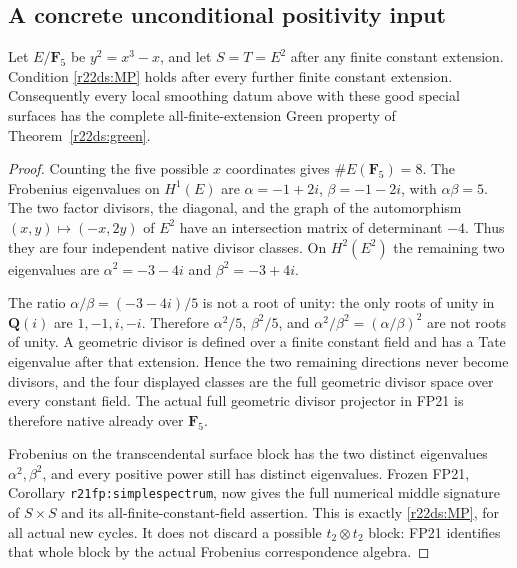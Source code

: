 \subsection{A concrete unconditional positivity input}

\begin{corollary}
\label{r22ds:elliptic}
Let $E/\mathbf F_5$ be $y^2=x^3-x$, and let $S=T=E^2$ after any
finite constant extension.  Condition \eqref{r22ds:MP} holds after
every further finite constant extension.  Consequently every local
smoothing datum above with these good special surfaces has the
complete all-finite-extension Green property of
Theorem~\ref{r22ds:green}.
\end{corollary}

\begin{proof}
Counting the five possible $x$ coordinates gives $\#E(\mathbf F_5)=8$.
The Frobenius eigenvalues on $H^1(E)$ are
$\alpha=-1+2i$, $\beta=-1-2i$, with $\alpha\beta=5$.
The two factor divisors, the diagonal, and the graph of the
automorphism $(x,y)\mapsto(-x,2y)$ of $E^2$ have an intersection
matrix of determinant $-4$.  Thus they are four independent native
divisor classes.  On $H^2(E^2)$ the remaining two eigenvalues are
$\alpha^2=-3-4i$ and $\beta^2=-3+4i$.

The ratio $\alpha/\beta=(-3-4i)/5$ is not a root of unity: the only
roots of unity in $\mathbf Q(i)$ are $1,-1,i,-i$.
Therefore $\alpha^2/5$, $\beta^2/5$, and
$\alpha^2/\beta^2=(\alpha/\beta)^2$ are not roots of unity.
A geometric divisor is defined over a finite constant field and
has a Tate eigenvalue after that extension.  Hence the two remaining
directions never become divisors, and the four displayed classes
are the full geometric divisor space over every constant field.
The actual full geometric divisor projector in FP21 is therefore
native already over $\mathbf F_5$.

Frobenius on the transcendental surface block has the two distinct
eigenvalues $\alpha^2,\beta^2$, and every positive power still has
distinct eigenvalues.  Frozen FP21, Corollary
\texttt{r21fp:simplespectrum}, now gives the full numerical middle
signature of $S\times S$ and its all-finite-constant-field assertion.
This is exactly \eqref{r22ds:MP}, for all actual new cycles.  It
does not discard a possible $t_2\otimes t_2$ block: FP21 identifies
that whole block by the actual Frobenius correspondence algebra.
\end{proof}

